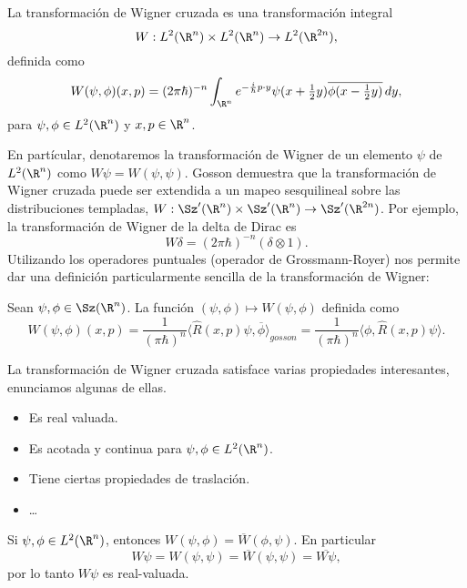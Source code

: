   \begin{definition}
    La transformación de Wigner cruzada es una
    transformación integral
    \[
      W : L^2(\R^{n}) \times L^2(\R^{n}) \to L^2(\R^{2n}),
    \]
    definida como
    \begin{equation}
      \label{eqn:cross_wigner_transform}
      W(\psi,\phi)(x,p)
      = (2\pi\hbar)^{-n} \int_{\R^{n}} e^{-\frac{i}{\hbar} p
      \cdot y} \psi(x + \tfrac{1}{2}y) \overline{\phi(x -
      \tfrac{1}{2}y)} \, dy,
    \end{equation}
    para $\psi, \phi \in L^2(\R^{n})$ y $x,p \in \R^{n}$.  
  \end{definition}
  En partícular, denotaremos la transformación de Wigner de
  un elemento $\psi$ de $L^2(\R^{n})$ como $W\psi =
  W(\psi,\psi)$. Gosson demuestra que la transformación de
  Wigner cruzada puede ser extendida a un mapeo sesquilineal
  sobre las distribuciones templadas, $W : \Sz'(\R^{n})
  \times \Sz'(\R^{n}) \to \Sz'(\R^{2n})$. Por ejemplo, la
  transformación de Wigner de la delta de Dirac es
  \[
    W\delta = (2\pi\hbar)^{-n} (\delta \otimes 1).
  \] 
  Utilizando los operadores puntuales (operador de
  Grossmann-Royer) nos permite dar una definición
  particularmente sencilla de la transformación de Wigner:
  \begin{definition}
    Sean $\psi,\phi \in \Sz(\R^{n})$. La función
    $(\psi,\phi) \mapsto W(\psi,\phi)$ definida como
    \begin{equation}
      W(\psi,\phi)(x,p)
      = \frac{1}{(\pi\hbar)^{n}} \langle \hat{R}(x,p)\psi,
      \overline{\phi} \rangle_{gosson}
      = \frac{1}{(\pi\hbar)^{n}} \langle \phi,
      \hat{R}(x,p)\psi \rangle.
    \end{equation}
  \end{definition}
  La transformación de Wigner cruzada satisface varias
  propiedades interesantes, enunciamos algunas de ellas.
  \begin{itemize}
    \item Es real valuada.
    \item Es acotada y continua para $\psi,\phi \in
      L^2(\R^{n})$.
    \item Tiene ciertas propiedades de traslación.
    \item \ldots
  \end{itemize}
  \begin{proposition}
    Si $\psi, \phi \in L^2(\R^{n})$, entonces $W(\psi,\phi)
    = \overline{W}(\phi,\psi)$. En particular
    \[
      W\psi
      = W(\psi,\psi)
      = \overline{W}(\psi,\psi)
      = \overline{W\psi},
    \] 
    por lo tanto $W\psi$ es real-valuada. 
  \end{proposition}

